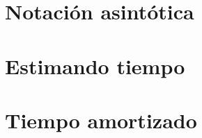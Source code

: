\lipsum[1-1]

\section{Notación asintótica}

\section{Estimando tiempo}

\section{Tiempo amortizado}
